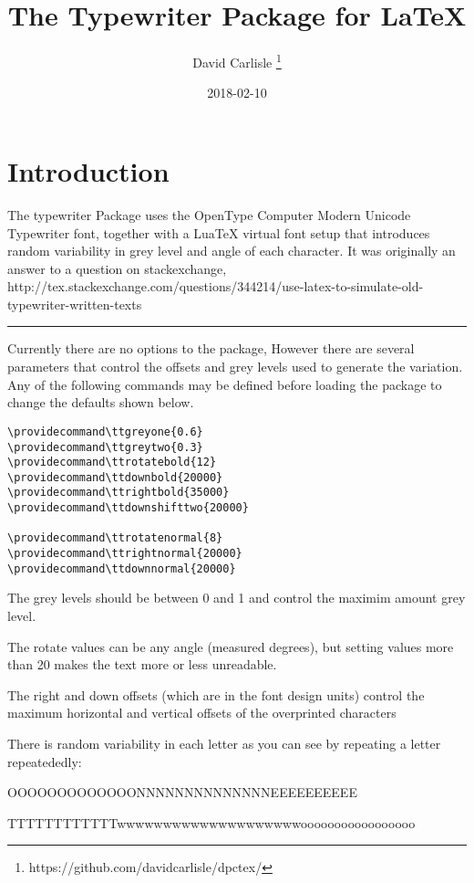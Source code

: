 \documentclass{article}
\begin{document}
\title{The Typewriter Package for LaTeX}
\author{David Carlisle \thanks{https://github.com/davidcarlisle/dpctex/}}
\date{2018-02-10}

\maketitle

\section{Introduction}
The typewriter Package uses the OpenType Computer Modern Unicode
Typewriter font, together with a LuaTeX virtual font setup that
introduces random variability in grey level and angle of each
character. It was originally an answer to a question on stackexchange,
http://tex.stackexchange.com/questions/344214/use-latex-to-simulate-old-typewriter-written-texts


\hrule

Currently there are no options to the package, However there are several parameters that control the offsets
and grey levels used to generate the variation. Any of the following
commands may be defined before loading the package to change the defaults shown below.

\begin{verbatim}
\providecommand\ttgreyone{0.6}
\providecommand\ttgreytwo{0.3}
\providecommand\ttrotatebold{12}
\providecommand\ttdownbold{20000}
\providecommand\ttrightbold{35000}
\providecommand\ttdownshifttwo{20000}

\providecommand\ttrotatenormal{8}
\providecommand\ttrightnormal{20000}
\providecommand\ttdownnormal{20000}
\end{verbatim}

The grey levels should be between 0 and 1 and control the maximim
amount grey level.

The rotate values can be any angle (measured degrees), but setting values more than 20 makes the text more or less unreadable.

The right and down offsets (which are in the font design units) control the
maximum horizontal and vertical offsets of the overprinted characters

There is random variability in each letter as you can see by repeating
a letter repeatededly:

OOOOOOOOOOOOONNNNNNNNNNNNNNEEEEEEEEEE

TTTTTTTTTTTTwwwwwwwwwwwwwwwwwwwwooooooooooooooooo
\end{document}
